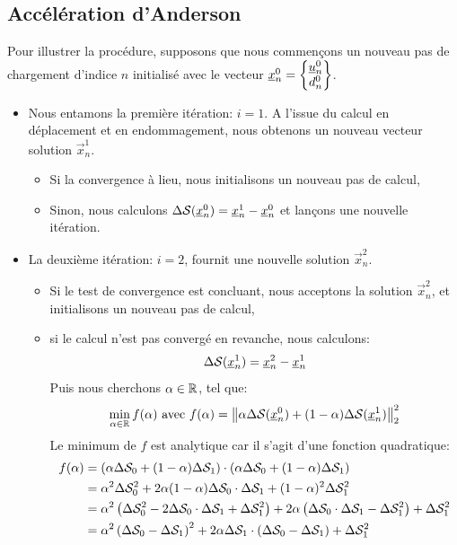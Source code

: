 \documentclass[10pt]{book}
\begin{document}
\begin{appendices}
\subsection{Accélération d'Anderson}
Pour illustrer la procédure, supposons que nous commençons un nouveau pas de chargement d'indice $n$ initialisé avec le vecteur $\vec{x}_{n}^{0}=\begin{Bmatrix}
\Dep_{n}^{0}\\
d_{n}^{0}
\end{Bmatrix}$. 
\begin{itemize}
\item Nous entamons la première itération: $i=1$. A l’issue du calcul en déplacement et en endommagement, nous obtenons un nouveau vecteur solution $\vec{x}_{n}^{1}$.
\begin{itemize}
\item Si la convergence à lieu, nous initialisons un nouveau pas de calcul, 
\item Sinon, nous calculons $\Delta\Ss(\vec{x}_{n}^{0})=\vec{x}_{n}^{1}-\vec{x}_{n}^{0}$ et lançons une nouvelle itération.
\end{itemize}
\item La deuxième itération: $i=2$, fournit une nouvelle solution $\vec{x}_{n}^{2}$. 
\begin{itemize}
\item Si le test de convergence est concluant, nous acceptons la solution $\vec{x}_{n}^{2}$, et initialisons un nouveau pas de calcul,
\item  si le calcul n'est pas convergé en revanche, nous calculons:
$$\Delta\Ss(\vec{x}_{n}^{1})=\vec{x}_{n}^{2}-\vec{x}_{n}^{1}$$
Puis nous cherchons $\alpha\in\RR$, tel que:
$$\min_{\alpha\in\RR}f(\alpha) \avec f(\alpha)=\left\Vert\alpha\Delta\Ss(\vec{x}_{n}^{0})+(1-\alpha)\Delta\Ss(\vec{x}_{n}^{1})\right\Vert_{2}^{2}$$
Le minimum de $f$ est analytique car il s'agit d'une fonction quadratique:
$$\begin{aligned}
f(\alpha)&=\left(\alpha\Delta\Ss_{0}+(1-\alpha)\Delta\Ss_{1}\right)\cdot\left(\alpha\Delta\Ss_{0}+(1-\alpha)\Delta\Ss_{1}\right)\\
&=\alpha^{2}\Delta\Ss_{0}^{2}+2\alpha(1-\alpha)\Delta\Ss_{0}\cdot\Delta\Ss_{1}+(1-\alpha)^{2}\Delta\Ss_{1}^{2}\\
&=\alpha^{2}\left(\Delta\Ss_{0}^{2}-2\Delta\Ss_{0}\cdot\Delta\Ss_{1}+\Delta\Ss_{1}^{2}\right)+2\alpha\left(\Delta\Ss_{0}\cdot\Delta\Ss_{1}-\Delta\Ss_{1}^{2}\right)+\Delta\Ss_{1}^{2}\\
&=\alpha^{2}\left(\Delta\Ss_{0}-\Delta\Ss_{1}\right)^{2}+2\alpha\Delta\Ss_{1}\cdot\left(\Delta\Ss_{0}-\Delta\Ss_{1}\right)+\Delta\Ss_{1}^{2}\\

\end{aligned}$$
\end{itemize}
\end{itemize}
\end{appendices}
\end{document}
